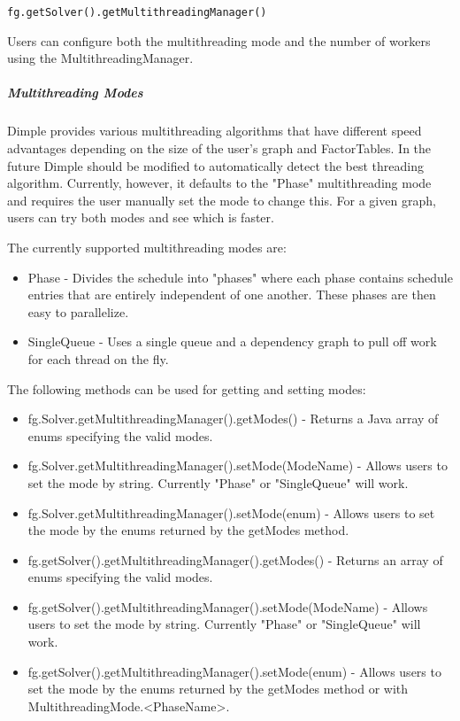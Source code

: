 \ifjava
\begin{lstlisting}
fg.getSolver().getMultithreadingManager()
\end{lstlisting}
\fi

Users can configure both the multithreading mode and the number of workers using the MultithreadingManager.

\subparagraph{Multithreading Modes}

Dimple provides various multithreading algorithms that have different speed advantages depending on the size of the user's graph and FactorTables.  In the future Dimple should be modified to automatically detect the best threading algorithm.  Currently, however, it defaults to the "Phase" multithreading mode and requires the user manually set the mode to change this.  For a given graph, users can try both modes and see which is faster.

The currently supported multithreading modes are:

\begin{itemize}
\item Phase - Divides the schedule into "phases" where each phase contains schedule entries that are entirely independent of one another.  These phases are then easy to parallelize.  
\item SingleQueue - Uses a single queue and a dependency graph to pull off work for each thread on the fly.  
\end{itemize}

The following methods can be used for getting and setting modes:


\ifmatlab

\begin{itemize}
\item fg.Solver.getMultithreadingManager().getModes() - Returns a Java array of enums specifying the valid modes.
\item fg.Solver.getMultithreadingManager().setMode(ModeName) - Allows users to set the mode by string.  Currently "Phase" or "SingleQueue" will work.
\item fg.Solver.getMultithreadingManager().setMode(enum) - Allows users to set the mode by the enums returned by the getModes method.
\end{itemize}

\fi

\ifjava
\begin{itemize}
\item fg.getSolver().getMultithreadingManager().getModes() - Returns an array of enums specifying the valid modes.
\item fg.getSolver().getMultithreadingManager().setMode(ModeName) - Allows users to set the mode by string.  Currently "Phase" or "SingleQueue" will work.
\item fg.getSolver().getMultithreadingManager().setMode(enum) - Allows users to set the mode by the enums returned by the getModes method or with MultithreadingMode.<PhaseName>.
\end{itemize}
\fi

